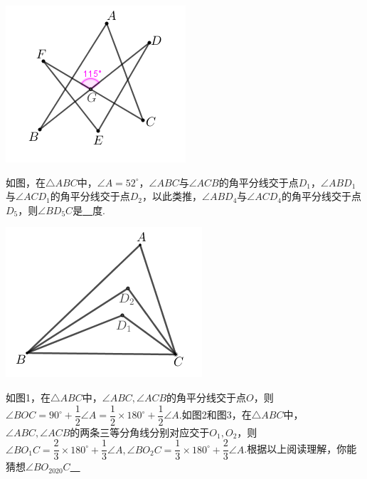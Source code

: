 \documentclass[10pt]{ctexart}
\begin{document}
 \includegraphics[scale=0.5]{figure/feibiao06.PNG}

\begin{shaded}
\begin{example}
如图，在$\triangle ABC$中，$\angle A=52^\circ$，$\angle ABC$与$\angle ACB$的角平分线交于点$D_1$，$\angle ABD_1$与$\angle ACD_1$的角平分线交于点$D_2$，以此类推，$\angle ABD_4$与$\angle ACD_4$的角平分线交于点$D_5$，则$\angle BD_5C$是\underline{~\hspace{1cm}~}度.
\end{example}
\end{shaded}

 \includegraphics[scale=0.6]{figure/feibiao07.PNG}

\begin{shaded}
\begin{example}
如图1，在$\triangle ABC$中，$\angle ABC,\angle ACB$的角平分线交于点$O$，则$\angle BOC=90^\circ+\dfrac{1}{2}\angle A=\dfrac{1}{2}\times 180^\circ+\dfrac{1}{2}\angle A$.如图2和图3，在$\triangle ABC$中，$\angle ABC,\angle ACB$的两条三等分角线分别对应交于$O_1,O_2$，则$\angle BO_1C=\dfrac{2}{3}\times 180^\circ+\dfrac{1}{3}\angle A,\angle BO_2C=\dfrac{1}{3}\times 180^\circ+\dfrac{2}{3}\angle A$.根据以上阅读理解，你能猜想$\angle BO_{2020}C$\underline{~\hspace{1cm}~}
\end{example}
\end{shaded}
\end{document}
